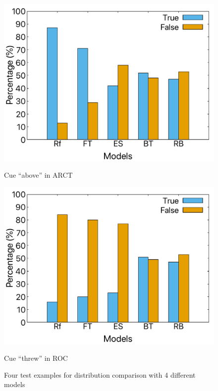 \begin{figure}[th]
\begin{minipage}[b]{0.45\linewidth}
\centering
\includegraphics[width=\columnwidth]{picture/above-arct.pdf}
\caption*{Cue ``above'' in ARCT} 
\label{fig:cue_above} 
\end{minipage}
\hspace{0.5cm} 
\begin{minipage}[b]{0.45\linewidth} 
\centering 
\includegraphics[width=\columnwidth]{picture/threw-roc.pdf} 
\caption*{Cue ``threw'' in ROC}
\label{fig:cue_threw}
\end{minipage}
\caption{Four test examples for distribution comparison with 4 different models}
\label{fig:cue_result}
\end{figure}

